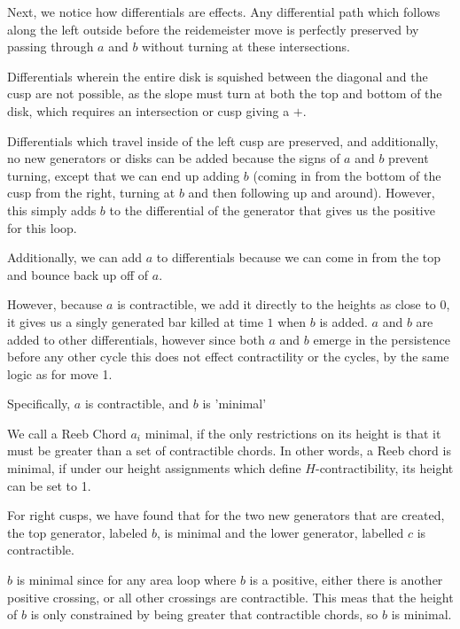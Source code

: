 \documentclass[11pt,oneside]{amsart}
\begin{document}
Next, we notice how differentials are effects. Any differential path which follows along the left outside before the reidemeister move is perfectly preserved by passing through $a$ and $b$ without turning at these intersections.

Differentials wherein the entire disk is squished between the diagonal and the cusp are not possible, as the slope must turn at both the top and bottom of the disk, which requires an intersection or cusp giving a $+$. 

Differentials which travel inside of the left cusp are preserved, and additionally, no new generators or disks can be added because the signs of $a$ and $b$ prevent turning, except that we can end up adding $b$ (coming in from the bottom of the cusp from the right, turning at $b$ and then following up and around). However, this simply adds $b$ to the differential of the generator that gives us the positive for this loop.

Additionally, we can add $a$ to differentials because we can come in from the top and bounce back up off of $a$.


However, because $a$ is contractible, we add it directly to the heights as close to $0$, it gives us a singly generated bar killed at time $1$ when $b$ is added. $a$ and $b$ are added to other differentials, however since both $a$ and $b$ emerge in the persistence before any other cycle this does not effect contractility or the cycles, by the same logic as for move 1. 

Specifically, $a$ is contractible, and $b$ is 'minimal'

\begin{definition}
    We call a Reeb Chord $a_i$ minimal, if the only restrictions on its height is that it must be greater than a set of contractible chords. In other words, a Reeb chord is minimal, if under our height assignments which define $H$-contractibility, its height can be set to 1.
\end{definition}

For right cusps, we have found that for the two new generators that are created, the top generator, labeled $b$, is minimal and the lower generator, labelled $c$ is contractible.

$b$ is minimal since for any area loop where $b$ is a positive, either there is another positive crossing, or all other crossings are contractible. This meas that the height of $b$ is only constrained by being greater that contractible chords, so $b$ is minimal.
\end{document}
